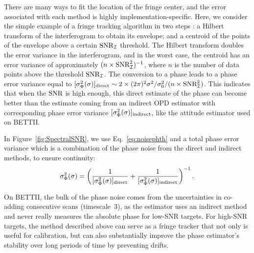 There are many ways to fit the location of the fringe center, and the error associated with each method is highly implementation-specific. Here, we consider the simple example of a fringe tracking algorithm in two steps \citep{Rizzo:2012jp}: a Hilbert transform of the interferogram to obtain its envelope; and a centroid of the points of the envelope above a certain $\textrm{SNR}_{\mathcal{I}}$ threshold. The Hilbert transform doubles the error variance in the interferogram, and in the worst case, the centroid has an error variance of approximately $ (n\times\textrm{SNR}_{\mathcal{I}}^2)^{-1}$, where $n$ is the number of data points above the threshold $\textrm{SNR}_{\mathcal{I}}$. The conversion to a phase leads to a phase error variance equal to $[\sigma^2_\Phi(\sigma)]_\textrm{direct} \sim 2\times(2\pi)^2 {\sigma^2/\sigma_0^2}/ (n\times\textrm{SNR}_{\mathcal{I}}^2)$. This indicates that when the $\textrm{SNR}$ is high enough, this direct estimate of the phase can become better than the estimate coming from an indirect OPD estimator with corresponding phase error variance $[\sigma^2_\Phi(\sigma)]_\textrm{indirect}$, like the attitude estimator used on BETTII. 


In Figure~\ref{fig:SpectralSNR}, we use Eq.~\ref{eq:noisephth} and a total phase error variance which is a combination of the phase noise from the direct and indirect methods, to ensure continuity:
\begin{equation}
\sigma^2_\Phi(\sigma) = \left( \frac{1}{[\sigma^2_\Phi(\sigma)]_\textrm{direct}} + \frac{1}{[\sigma^2_\Phi(\sigma)]_\textrm{indirect}}\right)^{-1}.
\end{equation}

On BETTII, the bulk of the phase noise comes from the uncertainties in co-adding consecutive scans (timescale~3), as the estimator uses an indirect method and never really measures the absolute phase for low-SNR targets. For high-SNR targets, the method described above can serve as a fringe tracker that not only is useful for calibration, but can also substantially improve the phase estimator's stability over long periods of time by preventing drifts.
